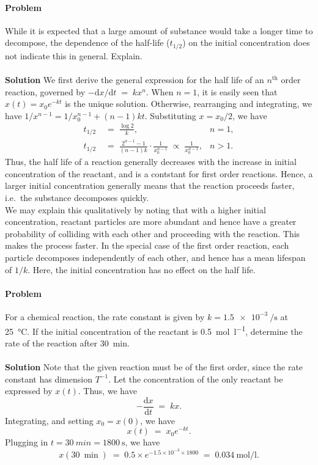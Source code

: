 \documentclass[10pt]{article}
\newcounter{prob}
\def\problem{\stepcounter{prob}\paragraph{Problem \arabic{prob}}}
\def\solution{\\\\\textbf{Solution }}
\begin{document}
        \problem While it is expected that a large amount of substance would take a longer time to decompose, the dependence of the half-life
        ($t_{1/2}$) on the initial concentration does not indicate this in general. Explain.
        \solution We first derive the general expression for the half life of an $n^\text{th}$ order reaction, governed by
        $-\mathrm{d}{x} /\mathrm{d}{t} \;=\; kx^n $. When $n = 1$, it is easily seen that $x(t) = x_0 e^{-kt}$ is the unique solution.
        Otherwise, rearranging and integrating, we have $1 /x^{n-1} = 1 /x_0^{n-1} + (n-1)kt$. Substituting $x = x_0 /2$, we have
        \begin{align*}
        t_{1 /2} \;&=\; \frac{\log{2}}{k}, & n = 1,\\
        t_{1 /2} \;&=\; \frac{2^{n-1} - 1}{(n-1)k}\cdot \frac{1}{x_0^{n-1}} \;\propto\; \frac{1}{x_0^{n-1}}, & n > 1.
        \end{align*}
        Thus, the half life of a reaction generally decreases with the increase in initial concentration of the reactant, and is a contstant
        for first order reactions. Hence, a larger initial concentration generally means that the reaction proceeds faster, i.e.\ 
        the substance decomposes quickly. \\

        We may explain this qualitatively by noting that with a higher initial concentration, reactant particles are more abundant
        and hence have a greater probability of colliding with each other and proceeding with the reaction. This makes the process faster.
        In the special case of the first order reaction, each particle decomposes independently of each other,
        and hence has a mean lifespan of $1 /k$. Here, the initial concentration has no effect on the half life.

        \problem For a chemical reaction, the rate constant is given by $k = \SI{1.5e-3}{\per\s}$ at \SI{25}{\celsius}.
        If the initial concentration of the reactant is \SI{0.5}{\mole\per\litre}, determine the rate of the reaction after \SI{30}{\minute}.
        \solution Note that the given reaction must be of the first order, since the rate constant has dimension $T^{-1}$. Let the
        concentration of the only reactant be expressed by $x(t)$. Thus, we have
        \[
        -\frac{\mathrm{d} x}{\mathrm{d}t} \;=\; kx.
        \]
        Integrating, and setting $x_0 = x(0)$, we have
        \[
                x(t) \;=\; x_0 e^{-kt}.
        \]
        Plugging in $t = \SI{30}{min} = \SI{1800}{\s}$, we have 
        \[
                x(\SI{30}{\min}) \;=\; 0.5 \times e^{- 1.5\times 10^{-3} \times 1800} \;=\; \SI{0.034}{\mole\per\litre}.
        \]
\end{document}
